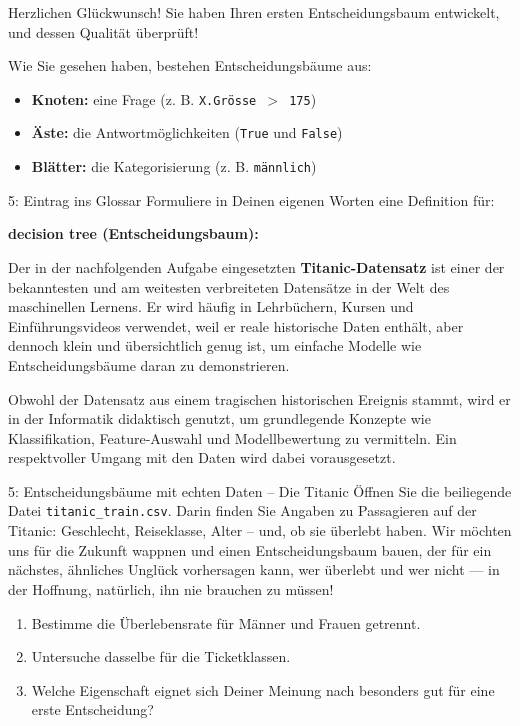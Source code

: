 \begin{lpu}
Herzlichen Glückwunsch! Sie haben Ihren ersten Entscheidungsbaum entwickelt, und dessen Qualität überprüft!

\begin{theorie}
Wie Sie gesehen haben, bestehen Entscheidungsbäume aus:
\begin{itemize}
  \item \textbf{Knoten:} eine Frage (z. B. \texttt{X.Grösse $>$ 175})
  \item \textbf{Äste:} die Antwortmöglichkeiten (\texttt{True} und \texttt{False})
  \item \textbf{Blätter:} die Kategorisierung (z. B. \texttt{männlich})
\end{itemize}
\end{theorie}

\begin{aufgabe}{5: Eintrag ins Glossar}
Formuliere in Deinen eigenen Worten eine Definition für:

\textbf{decision tree (Entscheidungsbaum):} \\
\underline{\hspace{15cm}}
\end{aufgabe}

Der in der nachfolgenden Aufgabe eingesetzten \textbf{Titanic-Datensatz} ist einer der bekanntesten und am weitesten verbreiteten Datensätze in der Welt des maschinellen Lernens. Er wird häufig in Lehrbüchern, Kursen und Einführungsvideos verwendet, weil er reale historische Daten enthält, aber dennoch klein und übersichtlich genug ist, um einfache Modelle wie Entscheidungsbäume daran zu demonstrieren.

Obwohl der Datensatz aus einem tragischen historischen Ereignis stammt, wird er in der Informatik didaktisch genutzt, um grundlegende Konzepte wie Klassifikation, Feature-Auswahl und Modellbewertung zu vermitteln. Ein respektvoller Umgang mit den Daten wird dabei vorausgesetzt.

\begin{aufgabe}{5: Entscheidungsbäume mit echten Daten – Die Titanic}
Öffnen Sie die beiliegende Datei \texttt{titanic\_train.csv}. Darin finden Sie Angaben zu Passagieren auf der Titanic: Geschlecht, Reiseklasse, Alter – und, ob sie überlebt haben. Wir möchten uns für die Zukunft wappnen und einen Entscheidungsbaum bauen, der für ein nächstes, ähnliches Unglück vorhersagen kann, wer überlebt und wer nicht — in der Hoffnung, natürlich, ihn nie brauchen zu müssen!

\begin{enumerate}
  \item Bestimme die Überlebensrate für Männer und Frauen getrennt.
  \item Untersuche dasselbe für die Ticketklassen.
  \item Welche Eigenschaft eignet sich Deiner Meinung nach besonders gut für eine erste Entscheidung?
\end{enumerate}
\end{aufgabe}


\end{lpu}
